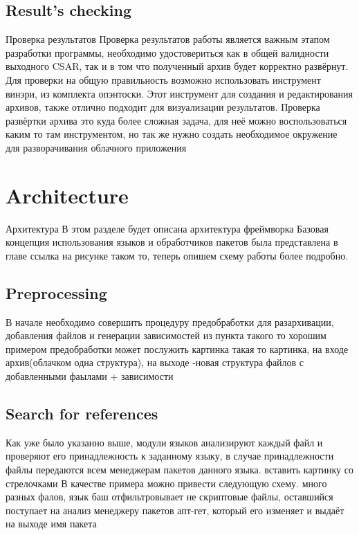 \subsection{Result's checking}
Проверка результатов
Проверка результатов работы является важным этапом разработки программы, необходимо удостовериться как в общей валидности выходного CSAR, так и в том что полученный архив будет корректно развёрнут. 
Для проверки на общую правильность возможно использовать инструмент винэри, из комплекта опэнтоски. Этот инструмент для создания и редактирования архивов, также отлично подходит для визуализации результатов.
Проверка развёртки архива это куда более сложная задача, для неё можно воспользоваться каким то там инструментом, но так же нужно создать необходимое окружение для разворачивания облачного приложения
 



\fi
\section{Architecture}\label{sec:arch}
Архитектура
В этом разделе будет описана архитектура фреймворка
Базовая концепция использования языков и обработчиков пакетов была представлена в главе ссылка на рисунке таком то, теперь опишем схему работы более подробно. 


\fi
\subsection{Preprocessing}
В начале необходимо совершить процедуру предобработки для разархивации, добавления файлов и генерации зависимостей из пункта такого то
хорошим примером предобработки может послужить картинка такая то
картинка, на входе архив(облачком одна структура), на выходе -новая структура файлов с добавленными фаылами + зависимости

\fi
\subsection{Search for references}
Как уже было указанно выше, модули языков анализируют каждый файл и проверяют его принадлежность к заданному языку, в случае принадлежности файлы передаются всем менеджерам пакетов данного языка. 
вставить картинку со стрелочками
В качестве примера можно привести следующую схему.
много разных фалов, язык баш отфильтровывает не скриптовые файлы, оставшийся поступает на анализ менеджеру пакетов апт-гет, который его изменяет и выдаёт на выходе имя пакета


